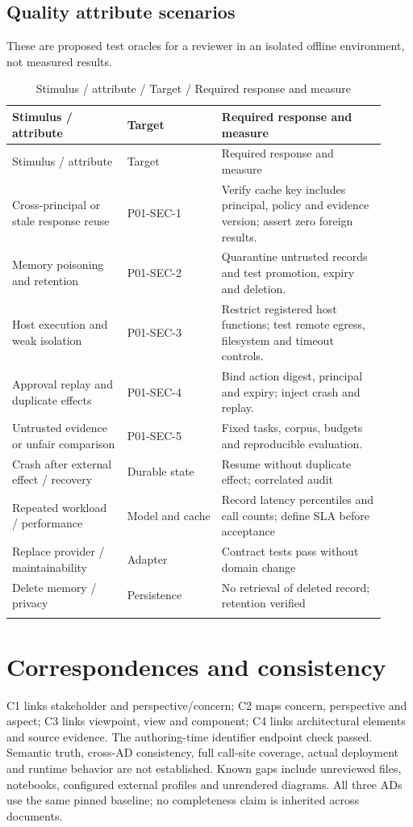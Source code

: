 \documentclass[10pt,letterpaper]{article}
\begin{document}
\subsection{Quality attribute scenarios}
These are proposed test oracles for a reviewer in an isolated offline environment, not measured results.
\begin{longtable}{@{}>{\raggedright\arraybackslash}p{0.29\linewidth}>{\raggedright\arraybackslash}p{0.23\linewidth}>{\raggedright\arraybackslash}p{0.4\linewidth}@{}}
\caption{Stimulus / attribute / Target / Required response and measure}\\
\toprule Stimulus / attribute & Target & Required response and measure\\\midrule\endfirsthead
\toprule Stimulus / attribute & Target & Required response and measure\\\midrule\endhead
Cross-principal or stale response reuse & P01-SEC-1 & Verify cache key includes principal, policy and evidence version; assert zero foreign results.\\\addlinespace
Memory poisoning and retention & P01-SEC-2 & Quarantine untrusted records and test promotion, expiry and deletion.\\\addlinespace
Host execution and weak isolation & P01-SEC-3 & Restrict registered host functions; test remote egress, filesystem and timeout controls.\\\addlinespace
Approval replay and duplicate effects & P01-SEC-4 & Bind action digest, principal and expiry; inject crash and replay.\\\addlinespace
Untrusted evidence or unfair comparison & P01-SEC-5 & Fixed tasks, corpus, budgets and reproducible evaluation.\\\addlinespace
Crash after external effect / recovery & Durable state & Resume without duplicate effect; correlated audit\\\addlinespace
Repeated workload / performance & Model and cache & Record latency percentiles and call counts; define SLA before acceptance\\\addlinespace
Replace provider / maintainability & Adapter & Contract tests pass without domain change\\\addlinespace
Delete memory / privacy & Persistence & No retrieval of deleted record; retention verified\\\addlinespace
\bottomrule\end{longtable}

\section{Correspondences and consistency}
C1 links stakeholder and perspective/concern; C2 maps concern, perspective and aspect; C3 links viewpoint, view and component; C4 links architectural elements and source evidence. The authoring-time identifier endpoint check passed. Semantic truth, cross-AD consistency, full call-site coverage, actual deployment and runtime behavior are not established. Known gaps include unreviewed files, notebooks, configured external profiles and unrendered diagrams. All three ADs use the same pinned baseline; no completeness claim is inherited across documents.
\end{document}
